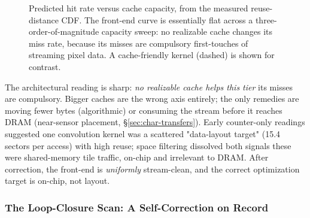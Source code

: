 \begin{figure}[t]
\centering
{}
\caption[Reuse-distance CDF: cache-immune streaming.]{Predicted hit rate versus
cache capacity, from the measured reuse-distance CDF. The front-end curve is
essentially flat across a three-order-of-magnitude capacity sweep: no realizable
cache changes its miss rate, because its misses are compulsory first-touches of
streaming pixel data. A cache-friendly kernel (dashed) is shown for contrast.}
\label{fig:cdf}
\end{figure}

The architectural reading is sharp: \emph{no realizable cache helps this tier} its misses are compulsory. Bigger caches are the wrong axis entirely; the only remedies are moving fewer bytes (algorithmic) or consuming the stream before it reaches DRAM (near-sensor placement, \S\ref{sec:char-transfers}). Early counter-only readings suggested one convolution kernel was a scattered "data-layout target" (15.4 sectors per access) with high reuse; space filtering dissolved both signals these were shared-memory tile traffic, on-chip and irrelevant to DRAM. After correction, the front-end is \emph{uniformly} stream-clean, and the correct optimization target is on-chip, not layout.

\subsubsection{The Loop-Closure Scan: A Self-Correction on Record}
\label{sec:loc-correction}

